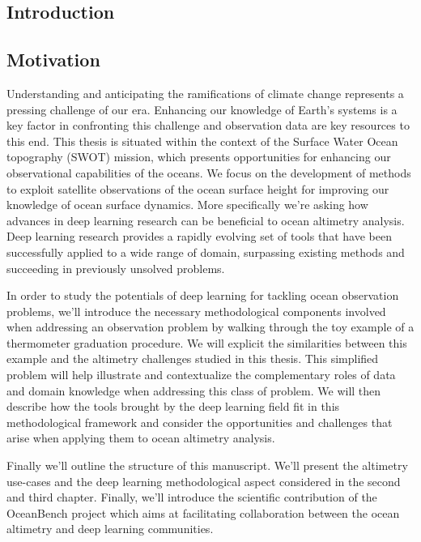 \begin{bibunit}

\chapter*{Introduction}

  \section{Motivation}
Understanding and anticipating the ramifications of climate change represents a pressing challenge of our era.
Enhancing our knowledge of Earth's systems is a key factor in confronting this challenge and observation data are key resources to this end.
  This thesis is situated within the context of the Surface Water Ocean topography (SWOT)\cite{KaRInSWOTCharacteristics} mission, which presents opportunities for enhancing our observational capabilities of the oceans.
  We focus on the development of methods to exploit satellite observations of the ocean surface height for improving our knowledge of ocean surface dynamics. 
  More specifically we're asking how advances in deep learning research can be beneficial to ocean altimetry analysis.
  Deep learning research provides a rapidly evolving set of tools that have been successfully applied to a wide range of domain, surpassing existing methods and succeeding in previously unsolved problems.
  
  In order to study the potentials of deep learning for tackling ocean observation problems, we'll introduce the necessary methodological components involved when addressing an observation problem by walking through the toy example of a thermometer graduation procedure.
  We will explicit the similarities between this example and the altimetry challenges studied in this thesis.
 This simplified problem will help illustrate and contextualize the complementary roles of data and domain knowledge when addressing this class of problem. 
  We will then describe how the tools brought by the deep learning field fit in this methodological framework and consider the opportunities and challenges that arise when applying them to ocean altimetry analysis.

  Finally we'll outline the structure of this manuscript. We'll present the altimetry use-cases and the deep learning methodological aspect considered in the second and third chapter. Finally, we'll introduce the scientific contribution of the OceanBench project which aims at facilitating collaboration between the ocean altimetry and deep learning communities.
  



\end{bibunit}
